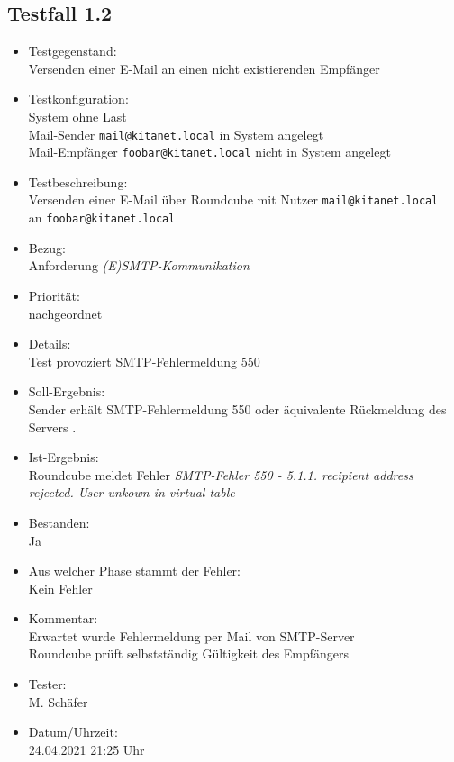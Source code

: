 \subsection{Testfall 1.2}
\begin{itemize}
	\item Testgegenstand:\\
	Versenden einer E-Mail an einen nicht existierenden Empfänger
	\item Testkonfiguration:\\
	System ohne Last\\
	Mail-Sender \verb+mail@kitanet.local+ in System angelegt\\
	Mail-Empfänger \verb+foobar@kitanet.local+ nicht in System angelegt
	\item Testbeschreibung:\\
	Versenden einer E-Mail über Roundcube mit Nutzer \verb+mail@kitanet.local+ \\ an \verb+foobar@kitanet.local+
	\item Bezug:\\
	Anforderung \textit{(E)SMTP-Kommunikation}
	\item Priorität:\\
	nachgeordnet
	\item Details:\\
	Test provoziert SMTP-Fehlermeldung 550
	\item Soll-Ergebnis:\\
	Sender erhält SMTP-Fehlermeldung 550 oder äquivalente Rückmeldung des Servers \citep[vgl.][16]{rfc821}.
	\item Ist-Ergebnis:\\
	Roundcube meldet Fehler \textit{SMTP-Fehler 550 - 5.1.1. recipient address rejected. User unkown in virtual table}
	\item Bestanden:\\
	Ja
	\item Aus welcher Phase stammt der Fehler:\\
	Kein Fehler
	\item Kommentar:\\
	Erwartet wurde Fehlermeldung per Mail von SMTP-Server\\
	Roundcube prüft selbstständig Gültigkeit des Empfängers
	\item Tester:\\
	M. Schäfer
	\item Datum/Uhrzeit:\\
	24.04.2021 21:25 Uhr
\end{itemize}

